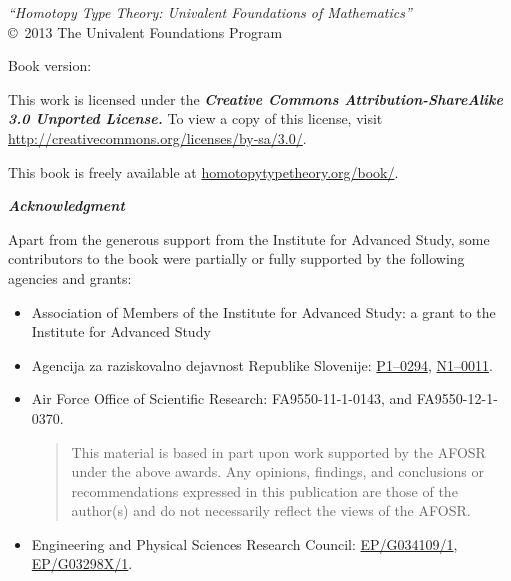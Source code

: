 \hbox{}
\vfill

{\small
\noindent
\emph{``Homotopy Type Theory: Univalent Foundations of Mathematics''}\\
\copyright\ 2013 The Univalent Foundations Program

\medskip
\noindent
Book version: \texttt{\OPTversion}

\bigskip
\footnotesize

\noindent
This work is licensed under the
\textbf{\emph{Creative Commons Attribution-ShareAlike 3.0 Unported License.}}
%
To view a copy of this license, visit
\href{http://creativecommons.org/licenses/by-sa/3.0/}{http://creativecommons.org/licenses/by-sa/3.0/}.

\bigskip

\noindent
This book is freely available at \href{http://homotopytypetheory.org/book/}{homotopytypetheory.org/book/}.

\bigskip

\noindent
\emph{\textbf{\small Acknowledgment}}

\medskip

\noindent
Apart from the generous support from the Institute for Advanced Study, some contributors
to the book were partially or fully supported by the following agencies and grants:
%
\begin{itemize}
\item Association of Members of the Institute for Advanced Study: a grant to the Institute for Advanced Study %
\item Agencija za raziskovalno dejavnost Republike Slovenije:  %
\href{http://www.sicris.si/search/prg.aspx?id=6120}{P1--0294},
\href{http://www.sicris.si/search/prj.aspx?id=7109}{N1--0011}.

\item Air Force Office of Scientific Research:
  FA9550-11-1-0143, and %
  FA9550-12-1-0370.  %
  {
    \setlength{\parskip}{0pt}
    \begin{quote}
      \noindent\scriptsize
      This material is based in part upon work supported by the AFOSR under the above awards.
      Any opinions, findings, and conclusions or recommendations expressed in this publication are those of the author(s) and do not necessarily reflect the views of the AFOSR.
    \end{quote}
  }

\item Engineering and Physical Sciences Research Council: %
   \href{http://gow.epsrc.ac.uk/NGBOViewGrant.aspx?GrantRef=EP/G034109/1}{EP/G034109/1}, %
   \href{http://gow.epsrc.ac.uk/NGBOViewGrant.aspx?GrantRef=EP/G03298X/1}{EP/G03298X/1}. %


\end{itemize}}
